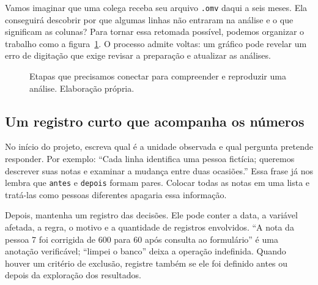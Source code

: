 Vamos imaginar que uma colega receba seu arquivo \texttt{.omv} daqui a seis meses. Ela conseguirá descobrir por que algumas linhas não entraram na análise e o que significam as colunas? Para tornar essa retomada possível, podemos organizar o trabalho como a figura~\ref{fig:ciclo-projeto-jamovi}. O processo admite voltas: um gráfico pode revelar um erro de digitação que exige revisar a preparação e atualizar as análises.

\begin{figure}[H]
\centering
{}
\caption{Etapas que precisamos conectar para compreender e reproduzir uma análise. Elaboração própria.}
\label{fig:ciclo-projeto-jamovi}
\end{figure}

\subsection{Um registro curto que acompanha os números}

No início do projeto, escreva qual é a unidade observada e qual pergunta pretende responder. Por exemplo: ``Cada linha identifica uma pessoa fictícia; queremos descrever suas notas e examinar a mudança entre duas ocasiões.'' Essa frase já nos lembra que \texttt{antes} e \texttt{depois} formam pares. Colocar todas as notas em uma lista e tratá-las como pessoas diferentes apagaria essa informação.

Depois, mantenha um registro das decisões. Ele pode conter a data, a variável afetada, a regra, o motivo e a quantidade de registros envolvidos. ``A nota da pessoa 7 foi corrigida de 600 para 60 após consulta ao formulário'' é uma anotação verificável; ``limpei o banco'' deixa a operação indefinida. Quando houver um critério de exclusão, registre também se ele foi definido antes ou depois da exploração dos resultados.

